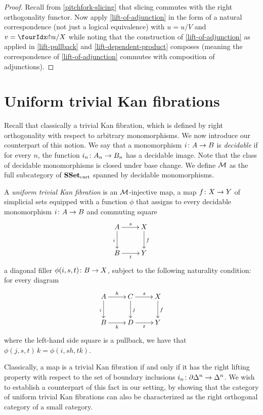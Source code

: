 \documentclass[reqno,10pt,a4paper,oneside]{amsart}
\begin{document}
\begin{proof}
Recall from \cref{pitchfork-slicing} that slicing commutes with the right orthogonality functor.
Now apply \cref{lift-of-adjunction} in the form of a natural correspondence (not just a logical equivalence) with $u = u/V$ and $v = \liftr{u}/X$ while noting that the construction of \cref{lift-of-adjunction} as applied in \cref{lift-pullback} and \cref{lift-dependent-product} composes (meaning the correspondence of \cref{lift-of-adjunction} commutes with composition of adjunctions).
\end{proof}






\section{Uniform trivial Kan fibrations}
\label{trivial-kan-fibrations}

Recall that classically a trivial Kan fibration, which is defined by right orthogonality with respect to arbitrary monomorphisms. We now introduce our counterpart of this notion. We say that a monomorphism 
$i \co A \to B$ is  \emph{decidable} if for every $n$, the function $i_n \co A_n \to B_n$ has a decidable image. 
Note that the class of decidable monomorphisms is closed under base change. We define $\cal{M}$ as the full subcategory of $\SSet_\cart$ spanned by decidable monomorphisms. 

\begin{definition} A \emph{uniform trivial Kan fibration}  is an $\cal{M}$-injective map,
\ie a map $f \co X \to Y$ of simplicial sets equipped with a function $\phi$
that assigns to every decidable monomorphism $i \co A \to B$ and commuting square 
 \[
 \xymatrix{
 A \ar[r]^s \ar[d]_i & X \ar[d]^f \\
 B \ar[r]_t & Y}
 \]
a diagonal filler $\phi(i, s, t) \co B \to X$, subject to the following naturality condition: for every 
diagram 
\[
\xymatrix{
A \ar[r]^{h} \ar[d]_{i} & C \ar[d]^{j}  \ar[r]^s & X \ar[d]^f \\
B \ar[r]_{k} & D \ar[r]_t & Y }
\]
where the left-hand side square is a pullback, we have that $\phi(j, s, t) \, k = \phi(i, s  h, t  k)$.
 \end{definition} 
 
 
 
 
 
 
Classically, a map is a  trivial Kan fibration if and only if it has the right lifting property with respect to the
set of boundary inclusions $i_n \co \partial \Delta^n \to \Delta^n$. We wish to establish a counterpart of 
this fact in our setting, by showing that the category of uniform trivial Kan fibrations can also be 
characterized as the right orthogonal category of  a small category.
\end{document}
